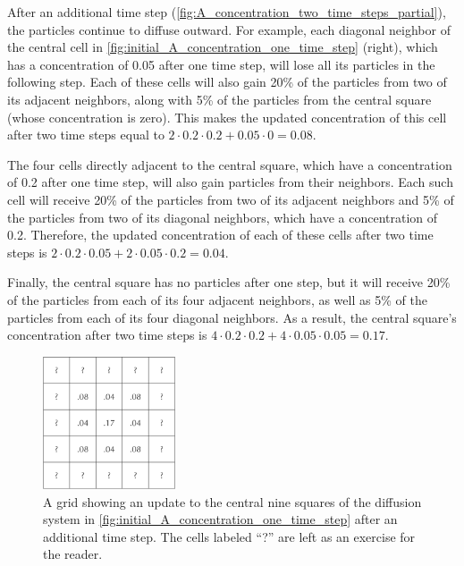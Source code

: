 After an additional time step (\autoref{fig:A_concentration_two_time_steps_partial}), the particles continue to diffuse outward. For example, each diagonal neighbor of the central cell in \autoref{fig:initial_A_concentration_one_time_step} (right), which has a concentration of 0.05 after one time step, will lose all its particles in the following step. Each of these cells will also gain 20\% of the particles from two of its adjacent neighbors, along with 5\% of the particles from the central square (whose concentration is zero). This makes the updated concentration of this cell after two time steps equal to $2 \cdot 0.2 \cdot 0.2 + 0.05 \cdot 0 = 0.08$.

The four cells directly adjacent to the central square, which have a concentration of 0.2 after one time step, will also gain particles from their neighbors. Each such cell will receive 20\% of the particles from two of its adjacent neighbors and 5\% of the particles from two of its diagonal neighbors, which have a concentration of 0.2. Therefore, the updated concentration of each of these cells after two time steps is $2 \cdot 0.2 \cdot 0.05 + 2 \cdot 0.05 \cdot 0.2 = 0.04$.

Finally, the central square has no particles after one step, but it will receive 20\% of the particles from each of its four adjacent neighbors, as well as 5\% of the particles from each of its four diagonal neighbors. As a result, the central square's concentration after two time steps is $4 \cdot 0.2 \cdot 0.2 + 4 \cdot 0.05 \cdot 0.05 = 0.17$.\\

\begin{figure}[h]
\centering
\mySfFamily
\includegraphics[width = 0.35\textwidth]{../images/A_concentration_two_time_steps_partial}
\caption{A grid showing an update to the central nine squares of the diffusion system in \autoref{fig:initial_A_concentration_one_time_step} after an additional time step. The cells labeled ``?'' are left as an exercise for the reader.}
\label{fig:A_concentration_two_time_steps_partial}
\end{figure}

